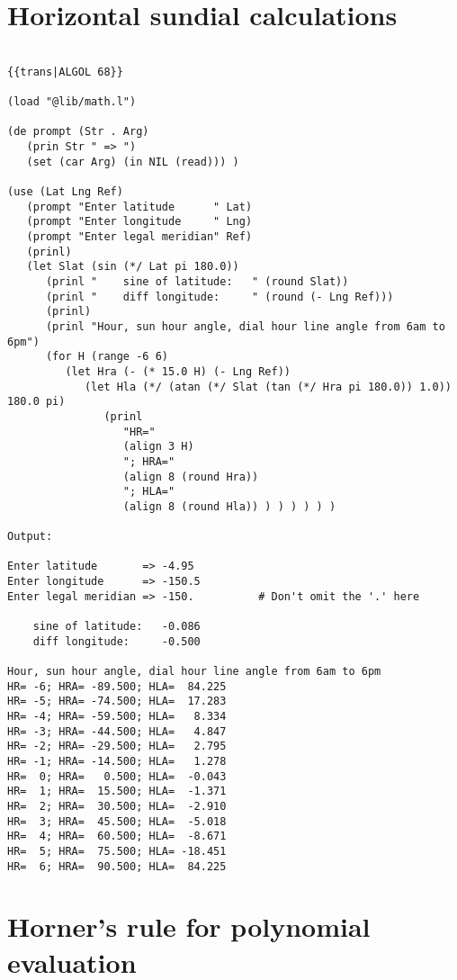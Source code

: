 \section*{Horizontal sundial calculations}

\begin{verbatim}

{{trans|ALGOL 68}}

(load "@lib/math.l")

(de prompt (Str . Arg)
   (prin Str " => ")
   (set (car Arg) (in NIL (read))) )

(use (Lat Lng Ref)
   (prompt "Enter latitude      " Lat)
   (prompt "Enter longitude     " Lng)
   (prompt "Enter legal meridian" Ref)
   (prinl)
   (let Slat (sin (*/ Lat pi 180.0))
      (prinl "    sine of latitude:   " (round Slat))
      (prinl "    diff longitude:     " (round (- Lng Ref)))
      (prinl)
      (prinl "Hour, sun hour angle, dial hour line angle from 6am to 6pm")
      (for H (range -6 6)
         (let Hra (- (* 15.0 H) (- Lng Ref))
            (let Hla (*/ (atan (*/ Slat (tan (*/ Hra pi 180.0)) 1.0)) 180.0 pi)
               (prinl
                  "HR="
                  (align 3 H)
                  "; HRA="
                  (align 8 (round Hra))
                  "; HLA="
                  (align 8 (round Hla)) ) ) ) ) ) )

Output:

Enter latitude       => -4.95
Enter longitude      => -150.5
Enter legal meridian => -150.          # Don't omit the '.' here

    sine of latitude:   -0.086
    diff longitude:     -0.500

Hour, sun hour angle, dial hour line angle from 6am to 6pm
HR= -6; HRA= -89.500; HLA=  84.225
HR= -5; HRA= -74.500; HLA=  17.283
HR= -4; HRA= -59.500; HLA=   8.334
HR= -3; HRA= -44.500; HLA=   4.847
HR= -2; HRA= -29.500; HLA=   2.795
HR= -1; HRA= -14.500; HLA=   1.278
HR=  0; HRA=   0.500; HLA=  -0.043
HR=  1; HRA=  15.500; HLA=  -1.371
HR=  2; HRA=  30.500; HLA=  -2.910
HR=  3; HRA=  45.500; HLA=  -5.018
HR=  4; HRA=  60.500; HLA=  -8.671
HR=  5; HRA=  75.500; HLA= -18.451
HR=  6; HRA=  90.500; HLA=  84.225

\end{verbatim}

\section*{Horner's rule for polynomial evaluation}

